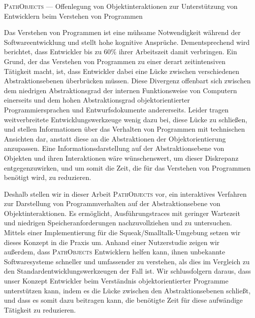 \begin{minipage}[t]{\textwidth}

	\setlength{\parindent}{0pt}
	\setlength{\parskip}{1ex plus 0.5ex minus 0.2ex}

\begin{flushleft}
{\Large \textsc{PathObjects} --- Offenlegung von Objektinteraktionen zur Unterstützung von Entwicklern beim Verstehen von Programmen}
\end{flushleft}

Das Verstehen von Programmen ist eine mühsame Notwendigkeit während der Softwareentwicklung und stellt hohe kognitive Ansprüche.
Dementsprechend wird berichtet, dass Entwickler bis zu 60\% ihrer Arbeitszeit damit verbringen.
Ein Grund, der das Verstehen von Programmen zu einer derart zeitintensiven Tätigkeit macht, ist, dass Entwickler dabei eine Lücke zwischen verschiedenen Abstraktionsebenen überbrücken müssen.
Diese Divergenz offenbart sich zwischen dem niedrigen Abstraktionsgrad der internen Funktionsweise von Computern einerseits und dem hohen Abstraktionsgrad objektorientierter Programmiersprachen und Entwurfsdokumente andererseits.
Leider tragen weitverbreitete Entwicklungswerkzeuge wenig dazu bei, diese Lücke zu schließen, und stellen Informationen über das Verhalten von Programmen mit technischen Ansichten dar, anstatt diese an die Abstraktionen der Objektorientierung anzupassen.
Eine Informationsdarstellung auf der Abstraktionsebene von Objekten und ihren Interaktionen wäre wünschenswert, um dieser Diskrepanz entgegenzuwirken, und um somit die Zeit, die für das Verstehen von Programmen benötigt wird, zu reduzieren.

Deshalb stellen wir in dieser Arbeit \textsc{PathObjects} vor, ein interaktives Verfahren zur Darstellung von Programmverhalten auf der Abstraktionsebene von Objektinteraktionen.
Es ermöglicht, Ausführungstraces mit geringer Wartezeit und niedrigen Speicheranforderungen nachzuvollziehen und zu untersuchen.
Mittels einer Implementierung für die Squeak/Smalltalk-Umgebung setzen wir dieses Konzept in die Praxis um.
Anhand einer Nutzerstudie zeigen wir außerdem, dass \textsc{PathObjects} Entwicklern helfen kann, ihnen unbekannte Softwaresysteme schneller und umfassender zu verstehen, als dies im Vergleich zu den Standardentwicklungswerkzeugen der Fall ist.
Wir schlussfolgern daraus, dass unser Konzept Entwickler beim Verständnis objektorientierter Programme unterstützen kann, indem es die Lücke zwischen den Abstraktionsebenen schließt, und dass es somit dazu beitragen kann, die benötigte Zeit für diese aufwändige Tätigkeit zu reduzieren.

\end{minipage}

